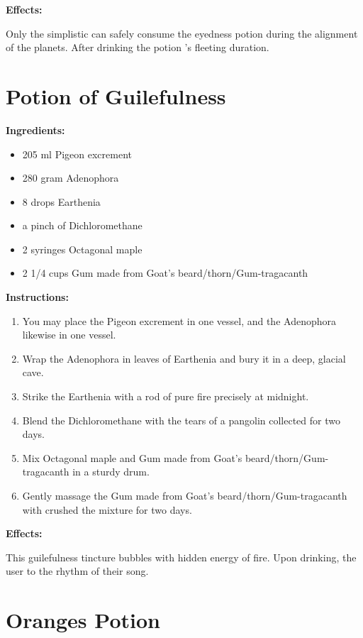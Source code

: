 \documentclass{article}
\begin{document}
\textbf{Effects:}

Only the simplistic can safely consume the eyedness potion during the alignment of the planets. After drinking the potion 's fleeting duration.

\newpage
\section*{Potion of Guilefulness}

\textbf{Ingredients:}

\begin{itemize}
  \item 205 ml Pigeon excrement
  \item 280 gram Adenophora
  \item 8 drops Earthenia
  \item a pinch of Dichloromethane
  \item 2 syringes Octagonal maple
  \item 2 1/4 cups Gum made from Goat's beard/thorn/Gum-tragacanth
\end{itemize}

\textbf{Instructions:}

\begin{enumerate}
  \item You may place the Pigeon excrement in one vessel, and the Adenophora likewise in one vessel.
  \item Wrap the Adenophora in leaves of Earthenia and bury it in a deep, glacial cave.
  \item Strike the Earthenia with a rod of pure fire precisely at midnight.
  \item Blend the Dichloromethane with the tears of a pangolin collected for two days.
  \item Mix Octagonal maple and Gum made from Goat's beard/thorn/Gum-tragacanth in a sturdy drum.
  \item Gently massage the Gum made from Goat's beard/thorn/Gum-tragacanth with crushed the mixture for two days.
\end{enumerate}

\textbf{Effects:}

This guilefulness tincture bubbles with hidden energy of fire. Upon drinking, the user to the rhythm of their song.

\newpage
\section*{Oranges Potion}
\end{document}
